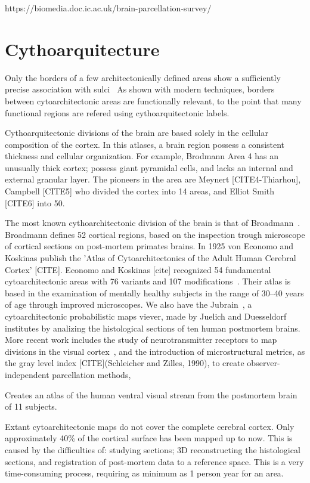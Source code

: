 https://biomedia.doc.ic.ac.uk/brain-parcellation-survey/


\section{Cythoarquitecture}
\label{sec:cyto_maps}
Only the borders of a few architectonically defined areas show a sufficiently precise association with sulci~\cite{Amunts2007}
As shown with modern techniques, borders between cytoarchitectonic areas are functionally relevant, to the point that many functional regions are refered using cythoarquitectonic labels.

Cythoarquitectonic divisions of the brain are based solely in the cellular
composition of the cortex. In this atlases, a brain region possess a consistent
thickness and cellular organization. For example, Brodmann Area 4 has an unusually
thick cortex; possess giant pyramidal cells, and lacks an internal and external
granular layer. The pioneers in the area are Meynert [CITE4-Thiarhou],
Campbell [CITE5] who divided the cortex into 14 areas, and Elliot Smith [CITE6]
into 50.

The most known cythoarchitectonic division of the brain is that
of Broadmann~\cite{Brodmann1909}. Broadmann defines 52 cortical regions, based
on the inspection trough microscope of cortical sections on post-mortem
primates brains. In 1925 von Economo and Koskinas publish the 'Atlas of 
Cytoarchitectonics of the Adult Human Cerebral Cortex' [CITE]. Economo and
Koskinas [cite] recognized 54 fundamental cytoarchitectonic areas with 76
variants and 107 modifications~\cite{Triarhou2007}. Their atlas is based in the
examination of mentally healthy subjects in the range of 30–40 years of age
through improved microscopes. We also have the Jubrain~\cite{Mohlberg2012}, a
cytoarchitectonic probabilistic maps viever, made by Juelich and Duesseldorf
institutes by analizing the histological sections of ten human postmortem brains.
More recent work includes the study of
neurotransmitter receptors to map divisions in the visual cortex~\cite{Eickhoff2008}, 
and the introduction of microstructural metrics, as the gray level index
[CITE](Schleicher and Zilles, 1990), to create observer-independent parcellation
methods, 

Creates an atlas of the human ventral visual stream from the postmortem brain
of 11 subjects\cite{Rosenke2018}.
    
Extant cytoarchitectonic maps do not cover the complete cerebral cortex. 
Only approximately 40\% of the cortical surface has been mapped up to now. 
This is caused by the difficulties of: studying sections; 3D reconstructing the
histological sections, and registration of post-mortem data to a reference space.
This is a very time-consuming process, requiring as minimum as 1 person year for
an area.



